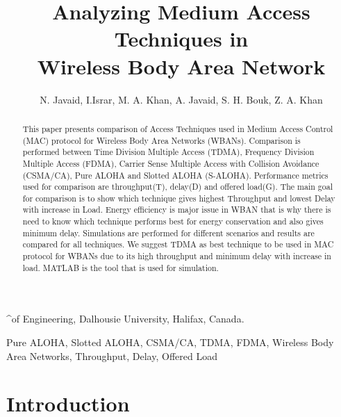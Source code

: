 \documentclass[11pt, conference, compsocconf, onecolumn]{IEEEtran}
\begin{document}
\title{Analyzing Medium Access Techniques in\\ Wireless Body Area Network}

\author{N. Javaid, I.Israr, M. A. Khan, A. Javaid, S. H. Bouk, Z. A. Khan}^{\Faculty of Engineering, Dalhousie University, Halifax, Canada.\\
     }

\maketitle


\begin{abstract}
This paper presents comparison of Access Techniques used in Medium Access Control (MAC) protocol for Wireless Body Area Networks (WBANs). Comparison is performed between Time Division Multiple Access (TDMA), Frequency Division Multiple Access (FDMA), Carrier Sense Multiple Access with Collision Avoidance (CSMA/CA), Pure ALOHA and Slotted ALOHA (S-ALOHA). Performance metrics used for comparison are throughput(T), delay(D) and offered load(G). The main goal for comparison is to show which technique gives highest Throughput and lowest Delay with increase in Load. Energy efficiency is major issue in WBAN that is why there is need to know which technique performs best for energy conservation and also gives minimum delay. Simulations are performed for different scenarios and results are compared for all techniques. We suggest TDMA as best technique to be used in MAC protocol for WBANs due to its high throughput and minimum delay with increase in load. MATLAB is the tool that is used for simulation.

\end{abstract}

\begin{IEEEkeywords}

Pure ALOHA, Slotted ALOHA, CSMA/CA, TDMA, FDMA, Wireless Body Area Networks, Throughput, Delay, Offered Load

\end{IEEEkeywords}


\section{Introduction}
\end{document}
